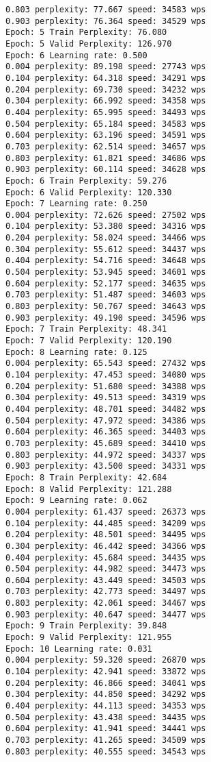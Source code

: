 \documentclass[11pt]{article}
\begin{document}
\begin{Verbatim}[commandchars=\\\{\}]
0.803 perplexity: 77.667 speed: 34583 wps
0.903 perplexity: 76.364 speed: 34529 wps
Epoch: 5 Train Perplexity: 76.080
Epoch: 5 Valid Perplexity: 126.970
Epoch: 6 Learning rate: 0.500
0.004 perplexity: 89.198 speed: 27743 wps
0.104 perplexity: 64.318 speed: 34291 wps
0.204 perplexity: 69.730 speed: 34232 wps
0.304 perplexity: 66.992 speed: 34358 wps
0.404 perplexity: 65.995 speed: 34493 wps
0.504 perplexity: 65.184 speed: 34583 wps
0.604 perplexity: 63.196 speed: 34591 wps
0.703 perplexity: 62.514 speed: 34657 wps
0.803 perplexity: 61.821 speed: 34686 wps
0.903 perplexity: 60.114 speed: 34628 wps
Epoch: 6 Train Perplexity: 59.276
Epoch: 6 Valid Perplexity: 120.330
Epoch: 7 Learning rate: 0.250
0.004 perplexity: 72.626 speed: 27502 wps
0.104 perplexity: 53.380 speed: 34316 wps
0.204 perplexity: 58.024 speed: 34466 wps
0.304 perplexity: 55.612 speed: 34437 wps
0.404 perplexity: 54.716 speed: 34648 wps
0.504 perplexity: 53.945 speed: 34601 wps
0.604 perplexity: 52.177 speed: 34635 wps
0.703 perplexity: 51.487 speed: 34603 wps
0.803 perplexity: 50.767 speed: 34643 wps
0.903 perplexity: 49.190 speed: 34596 wps
Epoch: 7 Train Perplexity: 48.341
Epoch: 7 Valid Perplexity: 120.190
Epoch: 8 Learning rate: 0.125
0.004 perplexity: 65.543 speed: 27432 wps
0.104 perplexity: 47.453 speed: 34080 wps
0.204 perplexity: 51.680 speed: 34388 wps
0.304 perplexity: 49.513 speed: 34319 wps
0.404 perplexity: 48.701 speed: 34482 wps
0.504 perplexity: 47.972 speed: 34386 wps
0.604 perplexity: 46.365 speed: 34403 wps
0.703 perplexity: 45.689 speed: 34410 wps
0.803 perplexity: 44.972 speed: 34337 wps
0.903 perplexity: 43.500 speed: 34331 wps
Epoch: 8 Train Perplexity: 42.684
Epoch: 8 Valid Perplexity: 121.288
Epoch: 9 Learning rate: 0.062
0.004 perplexity: 61.437 speed: 26373 wps
0.104 perplexity: 44.485 speed: 34209 wps
0.204 perplexity: 48.501 speed: 34495 wps
0.304 perplexity: 46.442 speed: 34366 wps
0.404 perplexity: 45.684 speed: 34435 wps
0.504 perplexity: 44.982 speed: 34473 wps
0.604 perplexity: 43.449 speed: 34503 wps
0.703 perplexity: 42.773 speed: 34497 wps
0.803 perplexity: 42.061 speed: 34467 wps
0.903 perplexity: 40.647 speed: 34477 wps
Epoch: 9 Train Perplexity: 39.848
Epoch: 9 Valid Perplexity: 121.955
Epoch: 10 Learning rate: 0.031
0.004 perplexity: 59.320 speed: 26870 wps
0.104 perplexity: 42.941 speed: 33872 wps
0.204 perplexity: 46.866 speed: 34041 wps
0.304 perplexity: 44.850 speed: 34292 wps
0.404 perplexity: 44.113 speed: 34353 wps
0.504 perplexity: 43.438 speed: 34435 wps
0.604 perplexity: 41.941 speed: 34441 wps
0.703 perplexity: 41.265 speed: 34509 wps
0.803 perplexity: 40.555 speed: 34543 wps

\end{Verbatim}
\end{document}
